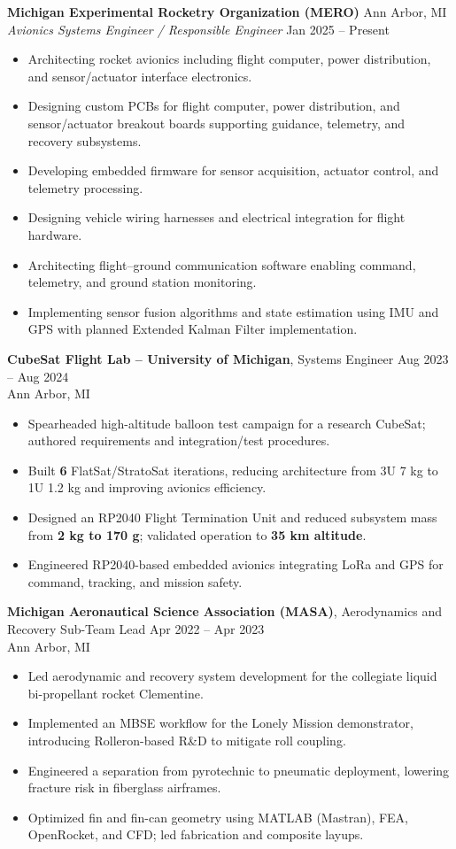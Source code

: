 \documentclass[10pt]{article}
\begin{document}
\textbf{Michigan Experimental Rocketry Organization (MERO)} \hfill Ann Arbor, MI \\
\textit{Avionics Systems Engineer / Responsible Engineer} \hfill Jan 2025 – Present

\begin{itemize}
\item Architecting rocket avionics including flight computer, power distribution, and sensor/actuator interface electronics.
\item Designing custom PCBs for flight computer, power distribution, and sensor/actuator breakout boards supporting guidance, telemetry, and recovery subsystems.
\item Developing embedded firmware for sensor acquisition, actuator control, and telemetry processing.
\item Designing vehicle wiring harnesses and electrical integration for flight hardware.
\item Architecting flight–ground communication software enabling command, telemetry, and ground station monitoring.
\item Implementing sensor fusion algorithms and state estimation using IMU and GPS with planned Extended Kalman Filter implementation.
\end{itemize}

{\bfseries CubeSat Flight Lab -- University of Michigan}, Systems Engineer \hfill Aug 2023 -- Aug 2024 \\
Ann Arbor, MI
\begin{itemize}
  \item Spearheaded high-altitude balloon test campaign for a research CubeSat; authored requirements and integration/test procedures.
  \item Built {\bfseries 6} FlatSat/StratoSat iterations, reducing architecture from 3U 7 kg to 1U 1.2 kg and improving avionics efficiency.
  \item Designed an RP2040 Flight Termination Unit and reduced subsystem mass from {\bfseries 2 kg to 170 g}; validated operation to {\bfseries 35 km altitude}.
  \item Engineered RP2040-based embedded avionics integrating LoRa and GPS for command, tracking, and mission safety.
\end{itemize}

{\bfseries Michigan Aeronautical Science Association (MASA)}, Aerodynamics and Recovery Sub-Team Lead \hfill Apr 2022 -- Apr 2023 \\
Ann Arbor, MI
\begin{itemize}
  \item Led aerodynamic and recovery system development for the collegiate liquid bi-propellant rocket Clementine.
  \item Implemented an MBSE workflow for the Lonely Mission demonstrator, introducing Rolleron-based R\&D to mitigate roll coupling.
  \item Engineered a separation from pyrotechnic to pneumatic deployment, lowering fracture risk in fiberglass airframes.
  \item Optimized fin and fin-can geometry using MATLAB (Mastran), FEA, OpenRocket, and CFD; led fabrication and composite layups.
\end{itemize}
\end{document}
